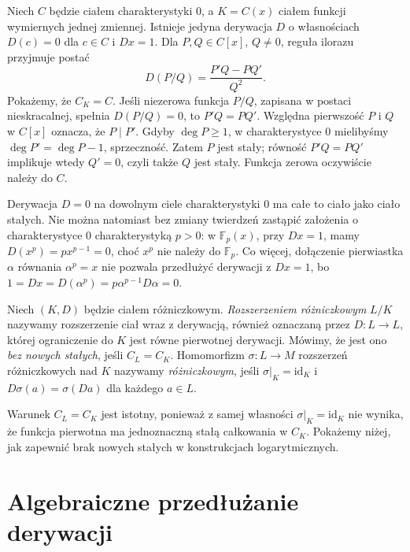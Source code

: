 \begin{przyklad}
\label{aa:prz:differential-rational-field}
Niech $C$ będzie ciałem charakterystyki $0$, a
$K=C(x)$ ciałem funkcji wymiernych jednej zmiennej.
Istnieje jedyna derywacja $D$ o własnościach
$D(c)=0$ dla $c\in C$ i $Dx=1$.
Dla $P,Q\in C[x]$, $Q\ne0$, reguła ilorazu przyjmuje postać
\[
D(P/Q)=\frac{P'Q-PQ'}{Q^2}.
\]
Pokażemy, że $C_K=C$. Jeśli niezerowa funkcja $P/Q$,
zapisana w postaci nieskracalnej, spełnia $D(P/Q)=0$,
to $P'Q=PQ'$. Względna pierwszość $P$ i $Q$
w $C[x]$ oznacza, że $P\mid P'$.
Gdyby $\deg P\ge1$, w charakterystyce $0$ mielibyśmy
$\deg P'=\deg P-1$, sprzeczność. Zatem $P$
jest stały; równość $P'Q=PQ'$ implikuje wtedy
$Q'=0$, czyli także $Q$ jest stały.
Funkcja zerowa oczywiście należy do $C$.
\end{przyklad}

\begin{przyklad}
\label{aa:prz:zero-derivation-and-positive-characteristic}
Derywacja $D=0$ na dowolnym ciele charakterystyki $0$
ma całe to ciało jako ciało stałych.
Nie można natomiast bez zmiany twierdzeń zastąpić
założenia o charakterystyce $0$ charakterystyką $p>0$:
w $\mathbb F_p(x)$, przy $Dx=1$, mamy
$D(x^p)=p x^{p-1}=0$, choć $x^p$ nie należy
do $\mathbb F_p$. Co więcej, dołączenie pierwiastka
$\alpha$ równania $\alpha^p=x$ nie pozwala przedłużyć
derywacji z $Dx=1$, bo
$1=Dx=D(\alpha^p)=p\alpha^{p-1}D\alpha=0$.
\end{przyklad}

\begin{definicja}
\label{aa:def:differential-extension}
Niech $(K,D)$ będzie ciałem różniczkowym.
\emph{Rozszerzeniem różniczkowym} $L/K$ nazywamy
rozszerzenie ciał wraz z derywacją, również
oznaczaną przez $D:L\to L$, której ograniczenie
do $K$ jest równe pierwotnej derywacji.
Mówimy, że jest ono \emph{bez nowych stałych},
jeśli $C_L=C_K$.
Homomorfizm $\sigma:L\to M$ rozszerzeń różniczkowych
nad $K$ nazywamy \emph{różniczkowym}, jeśli
$\sigma|_K=\mathrm{id}_K$ i $D\sigma(a)=\sigma(Da)$
dla każdego $a\in L$.
\end{definicja}

Warunek $C_L=C_K$ jest istotny, ponieważ z samej
własności $\sigma|_K=\mathrm{id}_K$ nie wynika,
że funkcja pierwotna ma jednoznaczną stałą całkowania
w $C_K$. Pokażemy niżej, jak zapewnić brak nowych
stałych w konstrukcjach logarytmicznych.

\section{Algebraiczne przedłużanie derywacji}

